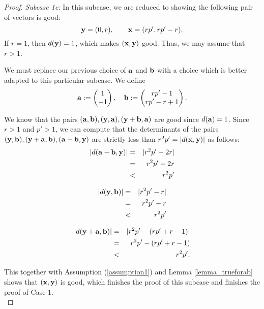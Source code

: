 \begin{proof}
	\noindent\emph{Subcase 1c:} In this subcase, we are reduced to showing the following pair of vectors is good: 
	\[
	{\mathbf{y}} = (0,r),\quad \quad {\mathbf{x}} = (rp', rp'-r).
	\]
	If $r=1$, then $d({\mathbf{y}})=1$, which makes $({\mathbf{x}},{\mathbf{y}})$ good. Thus, we may assume that $r>1$. 
	
	We must replace our previous choice of ${\mathbf{a}}$ and ${\mathbf{b}}$ with a choice which is better adapted to this particular subcase. We define
	\[
	{\mathbf{a}} := \begin{pmatrix} 1\\-1 \end{pmatrix},\quad {\mathbf{b}} := \begin{pmatrix} rp'-1\\rp' - r + 1 \end{pmatrix}.
	\]

	We know that the pairs $({\mathbf{a}}, {\mathbf{b}}), ({\mathbf{y}}, {\mathbf{a}}), ({\mathbf{y}}+{\mathbf{b}},{\mathbf{a}})$ are good since $d({\mathbf{a}})=1$. Since $r > 1$ and $p'>1$, we can compute that the determinants of the pairs $({\mathbf{y}},{\mathbf{b}}), ({\mathbf{y}}+{\mathbf{a}},{\mathbf{b}}), ({\mathbf{a}}-{\mathbf{b}},{\mathbf{y}})$ are strictly less than $r^2p' = \lvert d({\mathbf{x}},{\mathbf{y}}) \rvert$ as follows:
	\begin{eqnarray*}
		\lvert d({\mathbf{a}}-{\mathbf{b}},{\mathbf{y}})\rvert &=&  \lvert r^2p' - 2r \rvert \\
		&=& r^2p' - 2r \\
		&<& r^2p'
	\end{eqnarray*}

	\begin{eqnarray*}
		\lvert d({\mathbf{y}},{\mathbf{b}})\rvert &=&  \lvert r^2p' - r \rvert \\
		&=& r^2p' - r \\
		&<& r^2p'
	\end{eqnarray*}

	\begin{eqnarray*}
		\lvert d({\mathbf{y}}+{\mathbf{a}}, {\mathbf{b}})\rvert &=&  \lvert r^2p' - (rp'+r-1) \rvert \\
		&=&  r^2p' - (rp'+r-1) \\
		&<& r^2p'.
	\end{eqnarray*}

This together with Assumption (\ref{assumption1}) and Lemma \ref{lemma_trueforab} shows that $({\mathbf{x}},{\mathbf{y}})$ is good, which finishes the proof of this subcase and finishes the proof of Case 1. \\[2mm]
	

\end{proof}
